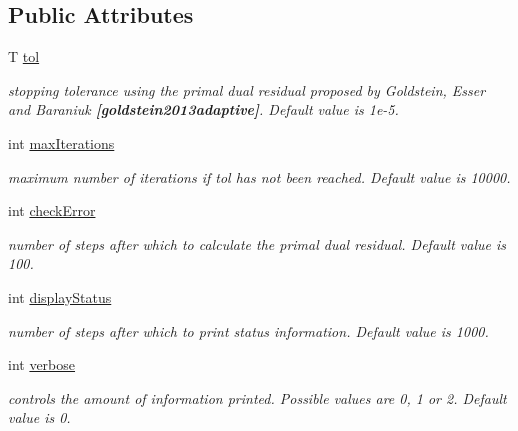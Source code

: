 \subsection*{Public Attributes}
\begin{DoxyCompactItemize}
\item 
\mbox{\label{classflex_box_acd4f987e22eb761cff9f6c98592808b4}} 
T \hyperlink{classflex_box_acd4f987e22eb761cff9f6c98592808b4}{tol}
\begin{DoxyCompactList}\small\item\em stopping tolerance using the primal dual residual proposed by Goldstein, Esser and Baraniuk {\bfseries [goldstein2013adaptive]}. Default value is 1e-\/5. \end{DoxyCompactList}\item 
int \hyperlink{classflex_box_aa20a8abc40427d7a4b8c709f1e38318d}{max\+Iterations}
\begin{DoxyCompactList}\small\item\em maximum number of iterations if tol has not been reached. Default value is 10000. \end{DoxyCompactList}\item 
\mbox{\label{classflex_box_a28507da8c03b9875319a2dd38e28cb4a}} 
int \hyperlink{classflex_box_a28507da8c03b9875319a2dd38e28cb4a}{check\+Error}
\begin{DoxyCompactList}\small\item\em number of steps after which to calculate the primal dual residual. Default value is 100. \end{DoxyCompactList}\item 
\mbox{\label{classflex_box_a0714316abd9498d53328da1f76f2a306}} 
int \hyperlink{classflex_box_a0714316abd9498d53328da1f76f2a306}{display\+Status}
\begin{DoxyCompactList}\small\item\em number of steps after which to print status information. Default value is 1000. \end{DoxyCompactList}\item 
\mbox{\label{classflex_box_aec255fffc4f4356a781be89fee0ed08f}} 
int \hyperlink{classflex_box_aec255fffc4f4356a781be89fee0ed08f}{verbose}
\begin{DoxyCompactList}\small\item\em controls the amount of information printed. Possible values are 0, 1 or 2. Default value is 0. \end{DoxyCompactList}\item 

\end{DoxyCompactItemize}
